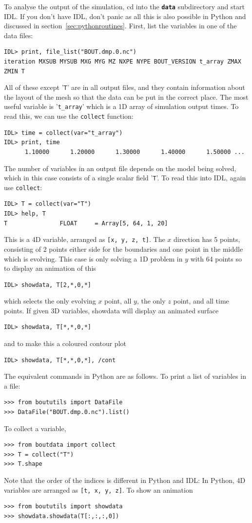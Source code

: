 \documentclass[12pt]{article}
\newcommand{\code}[1]{\texttt{#1}}
\newcommand{\file}[1]{\texttt{\bf #1}}
\begin{document}
To analyse the output of the simulation, cd into the \file{data} subdirectory and start IDL.
If you don't have IDL, don't panic as all this is also possible in Python and discussed
in section~\ref{sec:pythonroutines}. First, list the variables in one of the data files:
\begin{verbatim}
IDL> print, file_list("BOUT.dmp.0.nc")
iteration MXSUB MYSUB MXG MYG MZ NXPE NYPE BOUT_VERSION t_array ZMAX ZMIN T
\end{verbatim}
All of these except '\code{T}' are in all output files, and they contain information about
the layout of the mesh so that the data can be put in the correct place. The most useful variable
is '\code{t\_array}' which is a 1D array of simulation output times. To read this, we can
use the \code{collect} function:
\begin{verbatim}
IDL> time = collect(var="t_array")
IDL> print, time
      1.10000      1.20000      1.30000      1.40000      1.50000 ...
\end{verbatim}
The number of variables in an output file depends on the model being solved, which in this
case consists of a single scalar field '\code{T}'. To read this into IDL, again use \code{collect}:
\begin{verbatim}
IDL> T = collect(var="T")
IDL> help, T
T               FLOAT     = Array[5, 64, 1, 20]
\end{verbatim}
This is a 4D variable, arranged as \code{[x, y, z, t]}. The $x$ direction has 5 points, consisting
of 2 points either side for the boundaries and one point in the middle which is evolving. This case
is only solving a 1D problem in $y$ with 64 points so to display an animation of this
\begin{verbatim}
IDL> showdata, T[2,*,0,*]
\end{verbatim}
which selects the only evolving $x$ point, all $y$, the only $z$ point, and all time points.
If given 3D variables, showdata will display an animated surface
\begin{verbatim}
IDL> showdata, T[*,*,0,*]
\end{verbatim}
and to make this a coloured contour plot
\begin{verbatim}
IDL> showdata, T[*,*,0,*], /cont
\end{verbatim}

The equivalent commands in Python are as follows. To print a list of variables
in a file:
\begin{verbatim}
>>> from boututils import DataFile
>>> DataFile("BOUT.dmp.0.nc").list()
\end{verbatim}
To collect a variable,
\begin{verbatim}
>>> from boutdata import collect
>>> T = collect("T")
>>> T.shape
\end{verbatim}
Note that the order of the indices is different in Python and IDL: In Python,
4D variables are arranged as \code{[t, x, y, z]}.
To show an animation
\begin{verbatim}
>>> from boututils import showdata
>>> showdata.showdata(T[:,:,:,0])
\end{verbatim}
\end{document}
